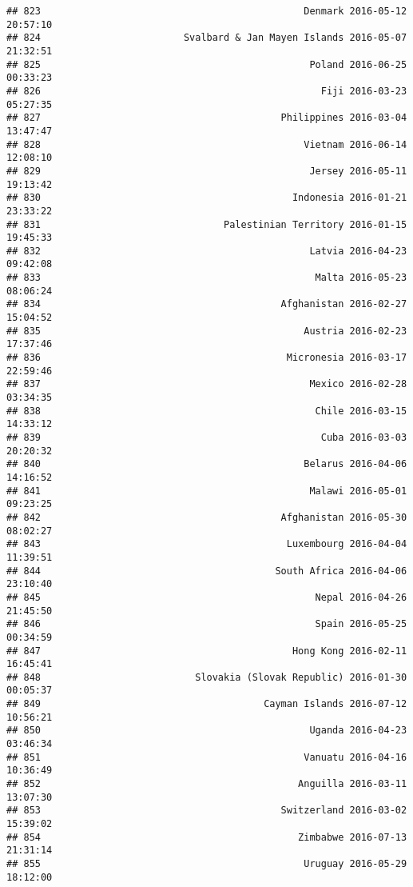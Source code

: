 \documentclass[
]{article}
\begin{document}
\begin{verbatim}
## 823                                              Denmark 2016-05-12 20:57:10
## 824                         Svalbard & Jan Mayen Islands 2016-05-07 21:32:51
## 825                                               Poland 2016-06-25 00:33:23
## 826                                                 Fiji 2016-03-23 05:27:35
## 827                                          Philippines 2016-03-04 13:47:47
## 828                                              Vietnam 2016-06-14 12:08:10
## 829                                               Jersey 2016-05-11 19:13:42
## 830                                            Indonesia 2016-01-21 23:33:22
## 831                                Palestinian Territory 2016-01-15 19:45:33
## 832                                               Latvia 2016-04-23 09:42:08
## 833                                                Malta 2016-05-23 08:06:24
## 834                                          Afghanistan 2016-02-27 15:04:52
## 835                                              Austria 2016-02-23 17:37:46
## 836                                           Micronesia 2016-03-17 22:59:46
## 837                                               Mexico 2016-02-28 03:34:35
## 838                                                Chile 2016-03-15 14:33:12
## 839                                                 Cuba 2016-03-03 20:20:32
## 840                                              Belarus 2016-04-06 14:16:52
## 841                                               Malawi 2016-05-01 09:23:25
## 842                                          Afghanistan 2016-05-30 08:02:27
## 843                                           Luxembourg 2016-04-04 11:39:51
## 844                                         South Africa 2016-04-06 23:10:40
## 845                                                Nepal 2016-04-26 21:45:50
## 846                                                Spain 2016-05-25 00:34:59
## 847                                            Hong Kong 2016-02-11 16:45:41
## 848                           Slovakia (Slovak Republic) 2016-01-30 00:05:37
## 849                                       Cayman Islands 2016-07-12 10:56:21
## 850                                               Uganda 2016-04-23 03:46:34
## 851                                              Vanuatu 2016-04-16 10:36:49
## 852                                             Anguilla 2016-03-11 13:07:30
## 853                                          Switzerland 2016-03-02 15:39:02
## 854                                             Zimbabwe 2016-07-13 21:31:14
## 855                                              Uruguay 2016-05-29 18:12:00

\end{verbatim}
\end{document}
